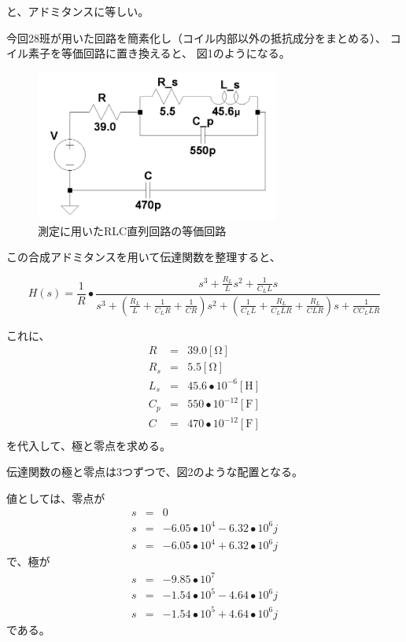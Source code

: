 \documentclass[10pt,a4j,dvipdfmx]{jsarticle}
\begin{document}
と、アドミタンスに等しい。

今回28班が用いた回路を簡素化し（コイル内部以外の抵抗成分をまとめる）、
コイル素子を等価回路に置き換えると、
図1のようになる。

\begin{figure}[H]
  \centering
  \includegraphics[width=8cm]{RLCkettei.png}
  \caption{測定に用いたRLC直列回路の等価回路}
\end{figure}

この合成アドミタンスを用いて伝達関数を整理すると、

\begin{equation}
H(s) = \frac{1}{R} \bullet \frac{s^{3}+\frac{R_{L}}{L}s^{2}+\frac{1}{C_{L}L}s}
{s^{3}
+\left(\frac{R_{L}}{L}+\frac{1}{C_{L}R}+\frac{1}{CR}\right)s^{2}
+\left(\frac{1}{C_{L}L}+\frac{R_{L}}{C_{L}LR}+\frac{R_{L}}{CLR}\right)s
+\frac{1}{CC_{L}LR}
}
\end{equation}

これに、
\begin{eqnarray}
R &=& 39.0\left[\si{\ohm}\right] \\
R_{s} &=& 5.5\left[\si{\ohm}\right] \\
L_{s} &=& 45.6\bullet10^{-6}\left[\si{\henry}\right] \\
C_{p} &=& 550\bullet10^{-12}\left[\si{\farad}\right] \\
C &=& 470\bullet10^{-12}\left[\si{\farad}\right] \\
\end{eqnarray}
を代入して、極と零点を求める。

伝達関数の極と零点は3つずつで、図2のような配置となる。

値としては、零点が
\begin{eqnarray}
s &=& 0 \\
s &=& -6.05\bullet10^4-6.32\bullet10^6 j \\
s &=& -6.05\bullet10^4+6.32\bullet10^6 j
\end{eqnarray}
で、極が
\begin{eqnarray}
s &=& -9.85\bullet10^7 \\
s &=& -1.54\bullet10^5-4.64\bullet10^6 j \\
s &=& -1.54\bullet10^5+4.64\bullet10^6 j
\end{eqnarray}
である。
\end{document}
